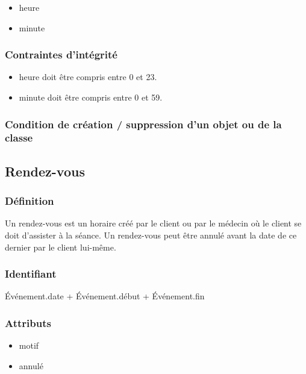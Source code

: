 \begin{itemize}
    \item{heure}
    \item{minute}
\end{itemize}

\subsubsection{Contraintes d'intégrité}

\begin{itemize}
    \item heure doit être compris entre 0 et 23.
    \item minute doit être compris entre 0 et 59.
\end{itemize}

\subsubsection{Condition de création / suppression d'un objet ou de la classe}

\subsection{Rendez-vous}

\subsubsection{Définition}

Un rendez-vous est un horaire créé par le client ou par le médecin où le client se doit 
d'assister à la séance.
Un rendez-vous peut être annulé avant la date de ce dernier par le client lui-même.

\subsubsection{Identifiant}

Événement.date + Événement.début + Événement.fin

\subsubsection{Attributs}

\begin{itemize}
    \item motif
    \item annulé
\end{itemize}


